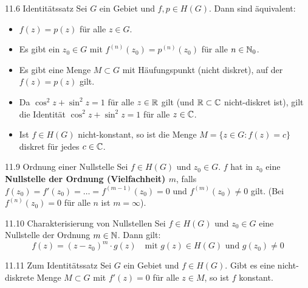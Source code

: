 \begin{satz}{11.6 Identitätssatz}
Sei $G$ ein Gebiet und $f, p \in H(G)$. Dann sind äquivalent:
\begin{itemize}
    \item[i)] $f(z) = p(z)$ für alle $z \in G$.
    \item[ii)] Es gibt ein $z_0 \in G$ mit $f^{(n)}(z_0) = p^{(n)}(z_0)$ für alle $n \in \mathbb{N}_0$.
    \item[iii)] Es gibt eine Menge $M \subset G$ mit Häufungspunkt (nicht diskret), auf der $f(z) = p(z)$ gilt.
\end{itemize}
\end{satz}

\begin{tcolorbox}[colback=white, colframe=black!70, title={Bsp. 11.7 \& Korollar 11.8}]
\begin{itemize}
    \item[11.7] Da $\cos^2 z + \sin^2 z = 1$ für alle $z \in \mathbb{R}$ gilt (und $\mathbb{R} \subset \mathbb{C}$ nicht-diskret ist), gilt die Identität $\cos^2 z + \sin^2 z = 1$ für alle $z \in \mathbb{C}$.
    \item[11.8] Ist $f \in H(G)$ nicht-konstant, so ist die Menge $M = \{z \in G : f(z) = c\}$ diskret für jedes $c \in \mathbb{C}$.
\end{itemize}
\end{tcolorbox}

\begin{defi}{11.9 Ordnung einer Nullstelle}
Sei $f \in H(G)$ und $z_0 \in G$. $f$ hat in $z_0$ eine \textbf{Nullstelle der Ordnung (Vielfachheit) $m$}, falls $f(z_0) = f'(z_0) = \dots = f^{(m-1)}(z_0) = 0$ und $f^{(m)}(z_0) \neq 0$ gilt. 
(Bei $f^{(n)}(z_0) = 0$ für alle $n$ ist $m = \infty$).
\end{defi}

\begin{satz}{11.10 Charakterisierung von Nullstellen}
Sei $f \in H(G)$ und $z_0 \in G$ eine Nullstelle der Ordnung $m \in \mathbb{N}$. Dann gilt:
\[
    f(z) = (z-z_0)^m \cdot g(z) \quad \text{mit } g(z) \in H(G) \text{ und } g(z_0) \neq 0
\]
\end{satz}

\begin{satz}{11.11 Zum Identitätssatz}
Sei $G$ ein Gebiet und $f \in H(G)$. Gibt es eine nicht-diskrete Menge $M \subset G$ mit $f'(z) = 0$ für alle $z \in M$, so ist $f$ konstant.
\end{satz}
